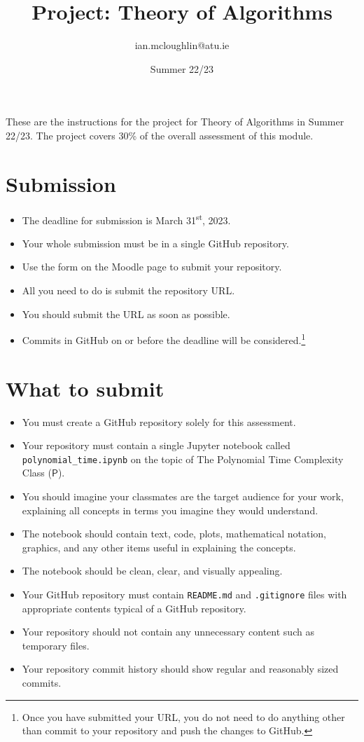 \documentclass{iansnotes}
\title{Project: Theory of Algorithms}
\author{ian.mcloughlin@atu.ie}
\date{Summer 22/23}
\begin{document}
 
\maketitle

These are the instructions for the project for Theory of Algorithms in Summer 22/23.
The project covers 30\% of the overall assessment of this module.


\section{Submission}

\begin{itemize}
  \item The deadline for submission is March 31\textsuperscript{st}, 2023. 
  \item Your whole submission must be in a single GitHub repository.
  \item Use the form on the Moodle page to submit your repository.
  \item All you need to do is submit the repository URL.
  \item You should submit the URL as soon as possible.
  \item Commits in GitHub on or before the deadline will be considered.\footnote{Once you have submitted your URL, you do not need to do anything other than commit to your repository and push the changes to GitHub.}
\end{itemize}


\section{What to submit}

\begin{itemize}
  \item You must create a GitHub repository solely for this assessment.
  \item Your repository must contain a single Jupyter notebook called \texttt{polynomial\_time.ipynb} on the topic of The Polynomial Time Complexity Class ($\textsf{P}$).
  \item You should imagine your classmates are the target audience for your work, explaining all concepts in terms you imagine they would understand.
  \item The notebook should contain text, code, plots, mathematical notation, graphics, and any other items useful in explaining the concepts.
  \item The notebook should be clean, clear, and visually appealing.
  \item Your GitHub repository must contain \texttt{README.md} and \texttt{.gitignore} files with appropriate contents typical of a GitHub repository.
  \item Your repository should not contain any unnecessary content such as temporary files.
  \item Your repository commit history should show regular and reasonably sized commits.
\end{itemize}
\end{document}
